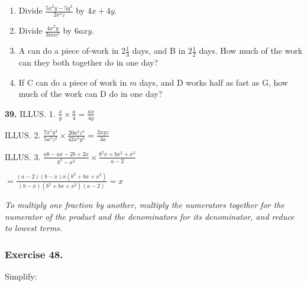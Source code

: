 \documentclass{book}
\begin{document}
\begin{enumerate}
\item Divide $\displaystyle  \frac{5 x^2 y - 5 y^3}{2 x^2 z} $ by
$ 4 x + 4 y $.

\item Divide $\displaystyle  \frac{4 x^2 y}{3 m n^2} $ by $ 6 a x
y $.

\item A can do a piece of-work in $2 \frac{1}{3}$ days, and B in
$2\frac{1}{2}$ days. How much of the work can they both together
do in one day?

\item If C can do a piece of work in $m$ days, and D works half as
fast as G, how much of the work can D do in one day?
\end{enumerate}

\textbf{ 39.} ILLUS. 1. $\displaystyle  \frac{x}{y} \times
\frac{a}{4} = \frac{a x}{4 y} $

ILLUS. 2. $\displaystyle \frac{7 x^5 y^4}{5 a^3 z^2} \times
\frac{20a^2 z^3}{42 x^4y^3} = \frac{2 xyz}{3 a}$

ILLUS. 3. $\displaystyle \frac{ab-ax-2 b+2 x}{b^3-x^3} \times
\frac{b^2 x+b x^2+x^3}{a-2} $
\begin{center} $\displaystyle = \frac{(a-2) (b-x) x (b^2+b x+x^2)}{(b-x) (b^2+b x+x^2) (a-2)} = x$\\ \end{center}

\textit{ To multiply one fraction by another, multiply the
numerators together for the numerator of the product and the
denominators for its denominator, and reduce to lowest terms.}

\subsubsection*{Exercise 48.}

Simplify:
\end{document}
